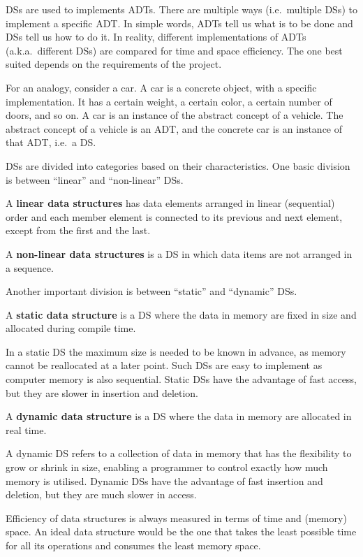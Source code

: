 DSs are used to implements ADTs. There are multiple ways (i.e.\ multiple DSs) to implement a specific ADT. In simple
words, ADTs tell us what is to be done and DSs tell us how to do it. In reality, different implementations of ADTs
(a.k.a.\ different DSs) are compared for time and space efficiency. The one best suited depends on the requirements of
the project.

\be
For an analogy, consider a car. A car is a concrete object, with a specific implementation. It has a certain weight,
a certain color, a certain number of doors, and so on. A car is an instance of the abstract concept of a vehicle. The
abstract concept of a vehicle is an ADT, and the concrete car is an instance of that ADT, i.e.\ a DS\@.
\ee

DSs are divided into categories based on their characteristics. One basic division is between ``linear''
and ``non-linear'' DSs.

A \textbf{linear data structures} has data elements arranged in linear (sequential) order and each member element is
connected to its previous and next element, except from the first and the last.
\ed

A \textbf{non-linear data structures} is a DS in which data items are not arranged in a sequence.
\ed

Another important division is between ``static'' and ``dynamic'' DSs.

A \textbf{static data structure} is a DS where the data in memory are fixed in size and allocated during compile time.
\ed

In a static DS the maximum size is needed to be known in advance, as memory cannot be reallocated at a later point. Such
DSs are easy to implement as computer memory is also sequential. Static DSs have the advantage of fast access, but they
are slower in insertion and deletion.

A \textbf{dynamic data structure} is a DS where the data in memory are allocated in real time.
\ed

A dynamic DS refers to a collection of data in memory that has the flexibility to grow or shrink in size, enabling a
programmer to control exactly how much memory is utilised. Dynamic DSs have the advantage of fast insertion and
deletion, but they are much slower in access.

Efficiency of data structures is always measured in terms of time and (memory) space. An ideal data structure would
be the one that takes the least possible time for all its operations and consumes the least memory space.


